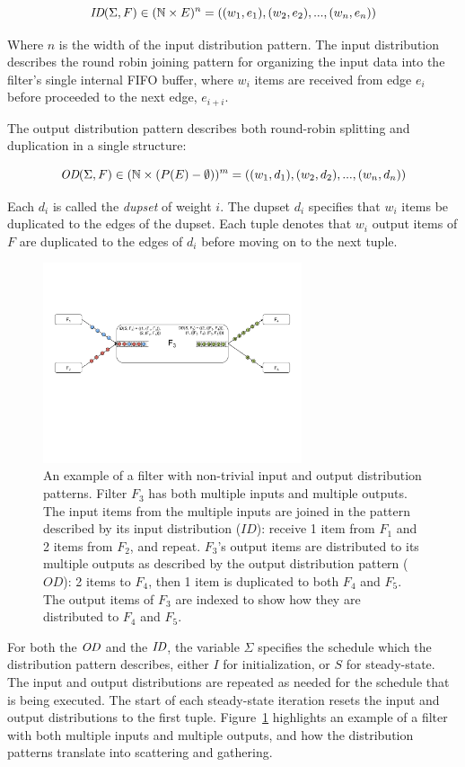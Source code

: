 \[ \mbox{\it ID}(\Sigma, F) \in (\mathbb{N} \times E)^n = ((w_1,e_1), (w_2,
e_2), ..., (w_n, e_n))\]

\noindent Where $n$ is the width of the input distribution pattern.
The input distribution describes the round robin joining pattern for
organizing the input data into the filter's single internal FIFO
buffer, where $w_i$ items are received from edge $e_i$ before
proceeded to the next edge, $e_{i+i}$.

The output distribution pattern describes both round-robin
splitting and duplication in a single structure:

\[ \mbox{\it OD}(\Sigma, F) \in (\mathbb{N} \times (P(E)-\emptyset))^m = ((w_1,d_1), (w_2,
d_2), ..., (w_n, d_n))\]

\noindent Each $d_i$ is called the {\it dupset} of weight $i$.  The
dupset $d_i$ specifies that $w_i$ items be duplicated to the edges
of the dupset.  Each tuple denotes that $w_i$ output items of $F$ are
duplicated to the edges of $d_i$ before moving on to the next tuple.

\begin{figure}[t]
\centering
\includegraphics[width=3in]{figures/dist-example.pdf}
\caption[Example of input and output distribution.]{
An example of a filter with non-trivial input and output distribution patterns.
Filter $F_3$ has both multiple inputs and multiple outputs.  The input
items from the multiple inputs are joined in the pattern described by
its input distribution ($ID$): receive 1 item from $F_1$ and 2
items from $F_2$, and repeat.  $F_3$'s output items are distributed to
its multiple outputs as described by the output distribution pattern
($OD$):  2 items to $F_4$, then 1 item is duplicated to both $F_4$ and
$F_5$.  The output items of $F_3$ are indexed to show how they are
distributed to $F_4$ and $F_5$.
\label{fig:dist-example}}
\end{figure}

For both the $\mbox{\it OD}$ and the $\mbox{\it ID}$, the variable
$\Sigma$ specifies the schedule which the distribution pattern
describes, either $I$ for initialization, or $S$ for steady-state.
The input and output distributions are repeated as needed for the
schedule that is being executed.  The start of each steady-state
iteration resets the input and output distributions to the first tuple.
Figure~\ref{fig:dist-example} highlights an example of a filter with
both multiple inputs and multiple outputs, and how the distribution
patterns translate into scattering and gathering.

